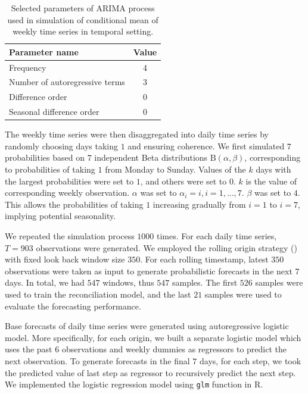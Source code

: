 \documentclass[a4paper,review,12pt,authoryear]{elsarticle}
\let\code=\texttt
\let\proglang=\textsf
\begin{document}
\begin{table}[h]
  \centering
  \caption{\label{tab:parameters} Selected parameters of ARIMA process used in simulation of conditional mean of weekly time series in temporal setting.}
  \begin{tabular}{lc}
    \toprule
    Parameter name & Value \\ \midrule
    Frequency & 4 \\
    Number of autoregressive terms & 3 \\
    Difference order & 0 \\
    Seasonal difference order & 0 \\ \bottomrule
  \end{tabular}
\end{table}

The weekly time series were then disaggregated into daily time series by randomly choosing days taking $1$ and ensuring coherence. 
We first simulated $7$ probabilities based on $7$ independent Beta distributions $\textrm{B}(\alpha, \beta)$, corresponding to probabilities of taking $1$ from Monday to Sunday. 
Values of the $k$ days with the largest probabilities were set to $1$, and others were set to $0$. $k$ is the value of corresponding weekly observation.
$\alpha$ was set to $\alpha_i = i, i=1,\dots,7$. $\beta$ was set to $4$. This allows the probabilities of taking $1$ increasing gradually from $i=1$ to $i=7$, implying potential seasonality.

We repeated the simulation process $1000$ times. For each daily time series, $T=903$ observations were generated. We employed the rolling origin strategy () with fixed look back window size $350$. 
For each rolling timestamp, latest $350$ observations were taken as input to generate probabilistic forecasts in the next $7$ days. 
In total, we had $547$ windows, thus $547$ samples.
The first $526$ samples were used to train the reconciliation model, and the last $21$ samples were used to evaluate the forecasting performance.

Base forecasts of daily time series were generated using autoregressive logistic model. 
More specifically, for each origin, we built a separate logistic model which uses the past $6$ observations and weekly dummies as regressors to predict the next observation. 
To generate forecasts in the final $7$ days, for each step, we took the predicted value of last step as regressor to recursively predict the next step. We implemented the logistic regression model using \code{glm} function in \proglang{R}.
\end{document}
